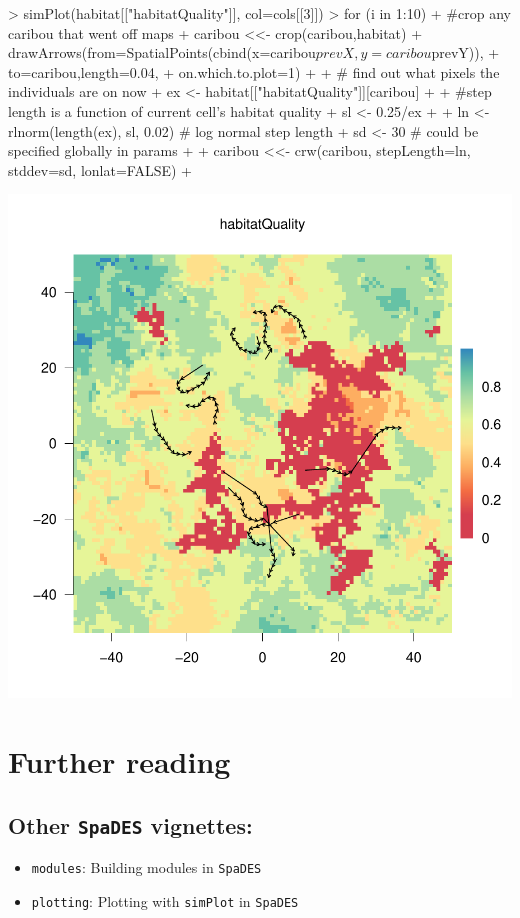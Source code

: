 \documentclass{article}
\begin{document}
\begin{Schunk}
\begin{Sinput}
> simPlot(habitat[["habitatQuality"]], col=cols[[3]])
> for (i in 1:10) {
+   #crop any caribou that went off maps
+   caribou <<- crop(caribou,habitat)
+   drawArrows(from=SpatialPoints(cbind(x=caribou$prevX, y=caribou$prevY)),
+              to=caribou,length=0.04,
+              on.which.to.plot=1)
+ 
+   # find out what pixels the individuals are on now
+   ex <- habitat[["habitatQuality"]][caribou]
+ 
+   #step length is a function of current cell's habitat quality
+   sl <- 0.25/ex
+ 
+   ln <- rlnorm(length(ex), sl, 0.02) # log normal step length
+   sd <- 30 # could be specified globally in params
+ 
+   caribou <<- crw(caribou, stepLength=ln, stddev=sd, lonlat=FALSE)
+ }
\end{Sinput}
\end{Schunk}
\includegraphics{introduction-agent-crw-trajectory}

\newpage

\section{Further reading}

\subsection{Other \texttt{SpaDES} vignettes:}

\begin{itemize}
\item \texttt{modules}: Building modules in \texttt{SpaDES}
\item \texttt{plotting}: Plotting with \texttt{simPlot} in \texttt{SpaDES}
\end{itemize}
\end{document}
